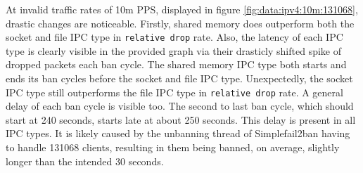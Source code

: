 At invalid traffic rates of 10m \ac{PPS}, displayed in figure \ref{fig:data:ipv4:10m:131068}, drastic changes are noticeable.
Firstly, shared memory does outperform both the socket and file \ac{IPC} type in \texttt{relative drop} rate.
Also, the latency of each \ac{IPC} type is clearly visible in the provided graph via their drasticly shifted spike of dropped packets each ban cycle.
The shared memory \ac{IPC} type both starts and ends its ban cycles before the socket and file \ac{IPC} type.
Unexpectedly, the socket \ac{IPC} type still outperforms the file \ac{IPC} type in \texttt{relative drop} rate.
A general delay of each ban cycle is visible too.
The second to last ban cycle, which should start at 240 seconds, starts late at about 250 seconds.
This delay is present in all \ac{IPC} types. 
It is likely caused by the unbanning thread of Simplefail2ban having to handle 131068 clients, resulting in them being banned, on average, slightly longer than the intended 30 seconds.

